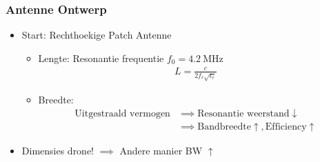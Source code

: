 \documentclass{beamer}
\begin{document}
  \begin{frame}
  \frametitle{Antenne Ontwerp}
  \begin{itemize}
    \item Start: Rechthoekige Patch Antenne
      \begin{itemize}
        \item Lengte: Resonantie frequentie $f_0 = \SI{4.2}{\mega\hertz}$
              \begin{align}  L = \frac{c}{2 f_r \sqrt{\epsilon_r}}  \nonumber \end{align}
        \item Breedte: \begin{align} \text{Uitgestraald vermogen} \nonumber & \implies \text{Resonantie weerstand} \downarrow \\ & \implies \text{Bandbreedte} \uparrow, \text{Efficiency} \uparrow \nonumber \end{align}

      \end{itemize}
    \item Dimensies drone! $\implies$ Andere manier BW $\uparrow$ 
    \end{itemize}
  \end{frame}
\end{document}
